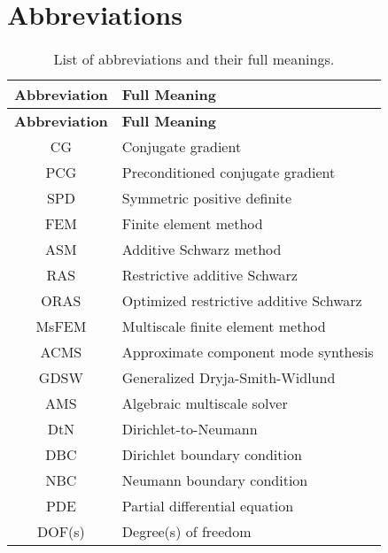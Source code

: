 \section*{Abbreviations}
\begin{longtable}{c p{10cm}}
    \caption{List of abbreviations and their full meanings.}\label{tab:abbreviations} \\
    \hline
    \textbf{Abbreviation} & \textbf{Full Meaning}                                     \\
    \hline
    \endfirsthead

    \hline
    \textbf{Abbreviation} & \textbf{Full Meaning}                                     \\
    \hline
    \endhead

    \hline
    \endfoot

    \hline
    \endlastfoot

    CG                    & Conjugate gradient                                        \\
    PCG                   & Preconditioned conjugate gradient                         \\
    SPD                   & Symmetric positive definite                               \\
    FEM                   & Finite element method                                     \\
    ASM                   & Additive Schwarz method                                   \\
    RAS                   & Restrictive additive Schwarz                              \\
    ORAS                  & Optimized restrictive additive Schwarz                    \\
    MsFEM                 & Multiscale finite element method                          \\
    ACMS                  & Approximate component mode synthesis                      \\
    GDSW                  & Generalized Dryja-Smith-Widlund                           \\
    AMS                   & Algebraic multiscale solver                               \\
    DtN                   & Dirichlet-to-Neumann                                      \\
    DBC                   & Dirichlet boundary condition                              \\
    NBC                   & Neumann boundary condition                                \\
    PDE                   & Partial differential equation                             \\
    DOF(s)                & Degree(s) of freedom                                      \\
\end{longtable}

\pagestyle{fancy}